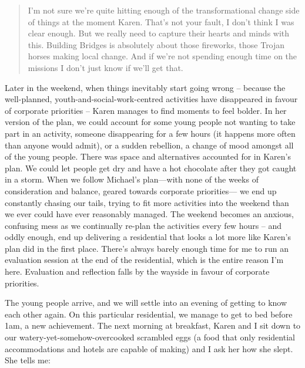 \begin{quote}
I’m not sure we’re quite hitting enough of the transformational change side of things at the moment Karen. That’s not your fault, I don’t think I was clear enough. But we really need to capture their hearts and minds with this. Building Bridges is absolutely about those fireworks, those Trojan horses making local change. And if we’re not spending enough time on the missions I don’t just know if we’ll get that.
\end{quote}

Later in the weekend, when things inevitably start going wrong – because the well-planned, youth-and-social-work-centred activities have disappeared in favour of corporate priorities – Karen manages to find moments to feel bolder. In her version of the plan, we could account for some young people not wanting to take part in an activity, someone disappearing for a few hours (it happens more often than anyone would admit), or a sudden rebellion, a change of mood amongst all of the young people. There was space and alternatives accounted for in Karen's plan. We could let people get dry and have a hot chocolate after they got caught in a storm. When we follow Michael’s plan—with none of the weeks of consideration and balance, geared towards corporate priorities— we end up constantly chasing our tails, trying to fit more activities into the weekend than we ever could have ever reasonably managed. The weekend becomes an anxious, confusing mess as we continually re-plan the activities every few hours – and oddly enough, end up delivering a residential that looks a lot more like Karen’s plan did in the first place. There’s always barely enough time for me to run an evaluation session at the end of the residential, which is the entire reason I’m here. Evaluation and reflection falls by the wayside in favour of corporate priorities. 

The young people arrive, and we will settle into an evening of getting to know each other again. On this particular residential, we manage to get to bed before 1am, a new achievement. The next morning at breakfast, Karen and I sit down to our watery-yet-somehow-overcooked scrambled eggs (a food that only residential accommodations and hotels are capable of making) and I ask her how she slept. She tells me:

